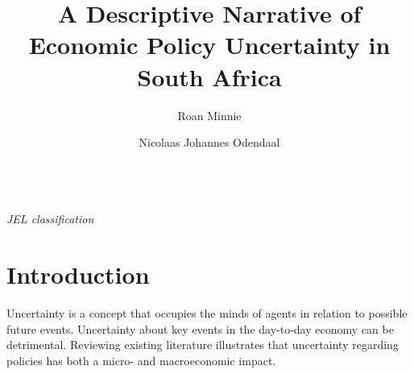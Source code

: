 \documentclass[11pt,preprint, authoryear]{elsarticle}
\numberwithin{equation}{section}
\numberwithin{figure}{section}
\numberwithin{table}{section}
\begin{document}
\begin{frontmatter}  %

\title{A Descriptive Narrative of Economic Policy Uncertainty in South Africa}





\author[Add1]{Roan Minnie}

\author[Add2]{Nicolaas Johannes Odendaal}




\address[Add1]{Stellenbosch University, Stellenbosch, South Africa}
\address[Add2]{Stellenbosch University, Stellenbosch, South Africa; Bureau of Economic
Research, South Africa}



\vspace{1cm}

\begin{keyword}
\footnotesize{
 \\ \vspace{0.3cm}
\textit{JEL classification} 
}
\end{keyword}
\vspace{0.5cm}
\end{frontmatter}



\pagestyle{fancy}
\chead{}
\rhead{}
\lfoot{}
\lhead{}
\cfoot{}


\headsep 35pt %




\section{\texorpdfstring{Introduction
\label{sec_intro}}{Introduction }}\label{introduction}

Uncertainty is a concept that occupies the minds of agents in relation
to possible future events. Uncertainty about key events in the
day-to-day economy can be detrimental. Reviewing existing literature
illustrates that uncertainty regarding policies has both a micro- and
macroeconomic impact.
\end{document}
